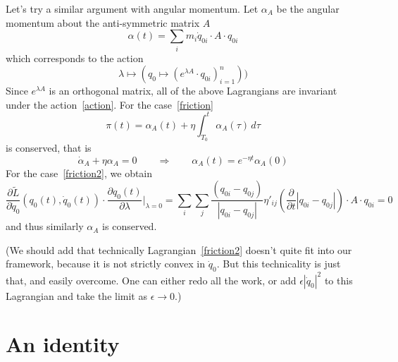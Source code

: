 \documentclass{amsart}
\begin{document}
Let's try a similar argument with angular momentum.  Let $\alpha_A$ be the angular momentum about the anti-symmetric matrix $A$
\begin{equation}
\alpha(t) = \sum_i m_i \dot q_{0i} \cdot A \cdot q_{0i}
\end{equation}
which corresponds to the action
\begin{equation}
\label{action2}
\lambda \mapsto (q_0 \mapsto (e^{\lambda A} \cdot q_{0i})_{i=1}^n))
\end{equation}
Since $e^{\lambda A}$ is an orthogonal matrix, all of the above Lagrangians are invariant under the action~\eqref{action}.  For the case~\eqref{friction}
\begin{equation}
\pi(t) = \alpha_A(t) + \eta \int_{T_0}^t \alpha_A(\tau) \, d\tau
\end{equation}
is conserved, that is
\begin{equation}
\dot \alpha_A + \eta \alpha_A = 0 \qquad \Rightarrow \qquad \alpha_A(t) = e^{-\eta t} \alpha_A(0)
\end{equation}
For the case~\eqref{friction2}, we obtain
\begin{equation}
\frac{\partial \tilde L}{\partial \dot q_0}(q_0(t),\dot q_0(t)) \cdot \frac{\partial q_0(t)}{\partial \lambda}\Big|_{\lambda = 0}
= \sum_i \sum_j \frac{(q_{0i}-q_{0j})}{|q_{0i}-q_{0j}|} \eta'_{ij}\left(\frac\partial{\partial t}|q_{0i}-q_{0j}|\right) \cdot A \cdot q_{0i}
= 0
\end{equation}
and thus similarly $\alpha_A$ is conserved.

(We should add that technically Lagrangian~\eqref{friction2} doesn't quite fit into our framework, because it is not strictly convex in $\dot q_0$.  But this technicality is just that, and easily overcome.  One can either redo all the work, or add $\epsilon|\dot q_0|^2$ to this Lagrangian and take the limit as $\epsilon\to 0$.)

\section{An identity}
\end{document}
